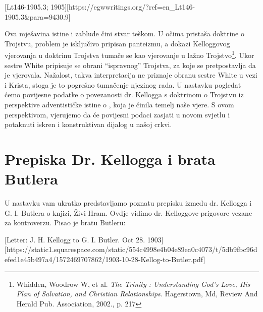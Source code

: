 [Lt146-1905.3; 1905][https://egwwritings.org/?ref=en\_Lt146-1905.3&para=9430.9]

Ova mješavina istine i zablude čini stvar teškom. U očima pristaša doktrine o Trojstvu, problem je isključivo pripisan panteizmu, a dokazi Kelloggovog vjerovanja u doktrinu Trojstva tumače se kao vjerovanje u lažno Trojstvo\footnote{Whidden, Woodrow W, et al. \textit{The Trinity : Understanding God's Love, His Plan of Salvation, and Christian Relationships}. Hagerstown, Md, Review And Herald Pub. Association, 2002., p. 217}. Ukor sestre White pripisuje se obrani “ispravnog” Trojstva, za koje se pretpostavlja da je vjerovala. Nažalost, takva interpretacija ne priznaje obranu sestre White  u vezi  i Krista, stoga je to pogrešno tumačenje njezinog rada. U nastavku pogledat ćemo povijesne podatke o povezanosti dr. Kellogga s doktrinom o Trojstvu iz perspektive adventističke istine o , koja je činila temelj naše vjere. S ovom perspektivom, vjerujemo da će povijesni podaci zasjati u novom svjetlu i potaknuti iskren i konstruktivan dijalog u našoj crkvi.

\section*{Prepiska Dr. Kellogga i brata Butlera}

U nastavku vam ukratko predstavljamo poznatu prepisku između dr. Kellogga i G. I. Butlera o knjizi, Živi Hram. Ovdje vidimo dr. Kelloggove prigovore vezane za kontroverzu. Pisao je bratu Butleru:

[Letter: J. H. Kellogg to G. I. Butler. Oct 28. 1903][https://static1.squarespace.com/static/554c4998e4b04e89ea0c4073/t/5db9fbc96defed1e45b497a4/1572469707862/1903-10-28-Kellog-to-Butler.pdf]

